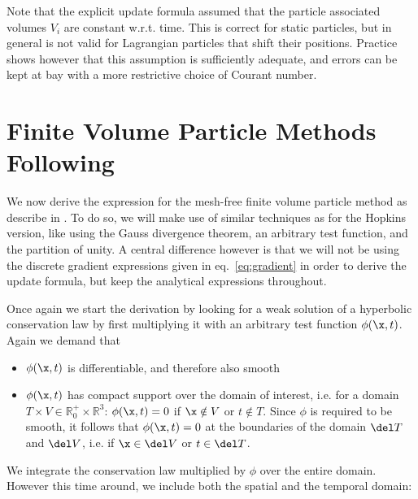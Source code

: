 Note that the explicit update formula assumed that the particle associated volumes $V_i$ are
constant w.r.t. time. This is correct for static particles, but in general is not valid for
Lagrangian particles that shift their positions. Practice shows however that this assumption is
sufficiently adequate, and errors can be kept at bay with a more restrictive choice of Courant
number.







\section{Finite Volume Particle Methods Following \citet{ivanovaCommonEnvelopeEvolution2013}}

We now derive the expression for the mesh-free finite volume particle method as describe in
\citet{ivanovaCommonEnvelopeEvolution2013}. To do so, we will make use of similar techniques as for
the Hopkins version, like using the Gauss divergence theorem, an arbitrary test function, and the
partition of unity. A central difference however is that we will not be using the discrete gradient
expressions given in eq.~\ref{eq:gradient} in order to derive the update formula, but keep the
analytical expressions throughout.

Once again we start the derivation by looking for a weak solution of a hyperbolic conservation law
by first multiplying it with an arbitrary test function $\phi(\x, t)$. Again we demand that

\begin{itemize}
 \item $\phi(\x, t)$ is differentiable, and therefore also smooth
 \item $\phi(\x, t)$ has compact support over the domain of interest, i.e. for a domain $T \times V
\in \mathds{R}_0^+ \times \mathds{R}^3$: $\phi(\x, t) = 0$ if $\x \notin V$ or $t \notin T$. Since
$\phi$ is required to be smooth, it follows that $\phi(\x, t) = 0$ at the boundaries of the
domain $\del T$ and $\del V$, i.e. if  $\x \in \del V$ or $t \in \del T$.
\end{itemize}

We integrate the conservation law multiplied by $\phi$ over the entire domain. However this time
around, we include both the spatial and the temporal domain:

